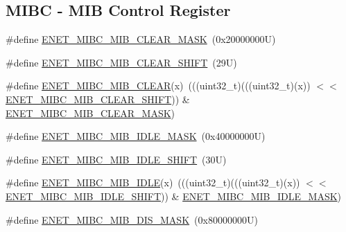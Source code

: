 \subsection*{M\+I\+BC -\/ M\+IB Control Register}
\begin{DoxyCompactItemize}
\item 
\#define \mbox{\hyperlink{group___e_n_e_t___register___masks_gaeab1ad7fdf634ff335c571ce0fcdbb71}{E\+N\+E\+T\+\_\+\+M\+I\+B\+C\+\_\+\+M\+I\+B\+\_\+\+C\+L\+E\+A\+R\+\_\+\+M\+A\+SK}}~(0x20000000\+U)
\item 
\#define \mbox{\hyperlink{group___e_n_e_t___register___masks_ga8bea19b7c620aa6b2af56b9d71da03b6}{E\+N\+E\+T\+\_\+\+M\+I\+B\+C\+\_\+\+M\+I\+B\+\_\+\+C\+L\+E\+A\+R\+\_\+\+S\+H\+I\+FT}}~(29\+U)
\item 
\#define \mbox{\hyperlink{group___e_n_e_t___register___masks_ga34c4546e3745bac9b9e6337a69c5fa13}{E\+N\+E\+T\+\_\+\+M\+I\+B\+C\+\_\+\+M\+I\+B\+\_\+\+C\+L\+E\+AR}}(x)~(((uint32\+\_\+t)(((uint32\+\_\+t)(x)) $<$$<$ \mbox{\hyperlink{group___e_n_e_t___register___masks_ga8bea19b7c620aa6b2af56b9d71da03b6}{E\+N\+E\+T\+\_\+\+M\+I\+B\+C\+\_\+\+M\+I\+B\+\_\+\+C\+L\+E\+A\+R\+\_\+\+S\+H\+I\+FT}})) \& \mbox{\hyperlink{group___e_n_e_t___register___masks_gaeab1ad7fdf634ff335c571ce0fcdbb71}{E\+N\+E\+T\+\_\+\+M\+I\+B\+C\+\_\+\+M\+I\+B\+\_\+\+C\+L\+E\+A\+R\+\_\+\+M\+A\+SK}})
\item 
\#define \mbox{\hyperlink{group___e_n_e_t___register___masks_ga780d8649845f0cce4e56318e194df98c}{E\+N\+E\+T\+\_\+\+M\+I\+B\+C\+\_\+\+M\+I\+B\+\_\+\+I\+D\+L\+E\+\_\+\+M\+A\+SK}}~(0x40000000\+U)
\item 
\#define \mbox{\hyperlink{group___e_n_e_t___register___masks_gaae8f76b07c6b9f2fc82ebad5baacc2a7}{E\+N\+E\+T\+\_\+\+M\+I\+B\+C\+\_\+\+M\+I\+B\+\_\+\+I\+D\+L\+E\+\_\+\+S\+H\+I\+FT}}~(30\+U)
\item 
\#define \mbox{\hyperlink{group___e_n_e_t___register___masks_ga9c6581075e158b28f7f394b156893620}{E\+N\+E\+T\+\_\+\+M\+I\+B\+C\+\_\+\+M\+I\+B\+\_\+\+I\+D\+LE}}(x)~(((uint32\+\_\+t)(((uint32\+\_\+t)(x)) $<$$<$ \mbox{\hyperlink{group___e_n_e_t___register___masks_gaae8f76b07c6b9f2fc82ebad5baacc2a7}{E\+N\+E\+T\+\_\+\+M\+I\+B\+C\+\_\+\+M\+I\+B\+\_\+\+I\+D\+L\+E\+\_\+\+S\+H\+I\+FT}})) \& \mbox{\hyperlink{group___e_n_e_t___register___masks_ga780d8649845f0cce4e56318e194df98c}{E\+N\+E\+T\+\_\+\+M\+I\+B\+C\+\_\+\+M\+I\+B\+\_\+\+I\+D\+L\+E\+\_\+\+M\+A\+SK}})
\item 
\#define \mbox{\hyperlink{group___e_n_e_t___register___masks_ga0e0763360e871b1a1f7e989f5695ece3}{E\+N\+E\+T\+\_\+\+M\+I\+B\+C\+\_\+\+M\+I\+B\+\_\+\+D\+I\+S\+\_\+\+M\+A\+SK}}~(0x80000000\+U)

\end{DoxyCompactItemize}
